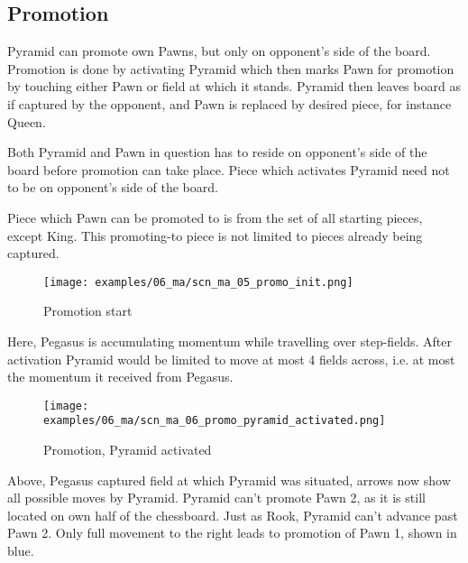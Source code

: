 \clearpage %

\subsection*{Promotion}
\label{sec:Mayan Ascendancy/Pyramid/Promotion}

Pyramid can promote own Pawns, but only on opponent's side of the board.
Promotion is done by activating Pyramid which then marks Pawn for promotion
by touching either Pawn or field at which it stands. Pyramid then leaves
board as if captured by the opponent, and Pawn is replaced by desired piece,
for instance Queen.

Both Pyramid and Pawn in question has to reside on opponent's side of the
board before promotion can take place. Piece which activates Pyramid need
not to be on opponent's side of the board.

Piece which Pawn can be promoted to is from the set of all starting pieces,
except King. This promoting-to piece is not limited to pieces already being
captured.

\clearpage %

\noindent
\begin{figure}[!h]
\texttt{[image: examples/06\_ma/scn\_ma\_05\_promo\_init.png]}
\caption{Promotion start}
\label{fig:scn_ma_05_promo_init}
\end{figure}

Here, Pegasus is accumulating momentum while travelling over step-fields. After
activation Pyramid would be limited to move at most 4 fields across, i.e. at most
the momentum it received from Pegasus.

\clearpage %

\noindent
\begin{figure}[!h]
\texttt{[image: examples/06\_ma/scn\_ma\_06\_promo\_pyramid\_activated.png]}
\caption{Promotion, Pyramid activated}
\label{fig:scn_ma_06_promo_pyramid_activated}
\end{figure}

Above, Pegasus captured field at which Pyramid was situated, arrows now show
all possible moves by Pyramid. Pyramid can't promote Pawn 2, as it is still
located on own half of the chessboard. Just as Rook, Pyramid can't advance
past Pawn 2. Only full movement to the right leads to promotion of Pawn 1,
shown in blue.

